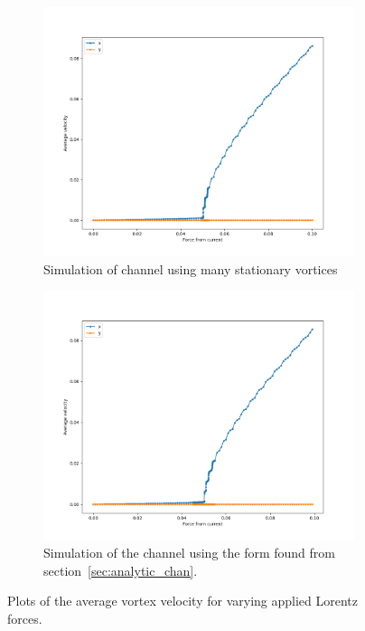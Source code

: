 \documentclass{article}
\numberwithin{equation}{section}
\begin{document}
\begin{figure}[htb]
\centering
\begin{subfigure}[t]{.49\textwidth}
    \centering
    \includegraphics[width=.9\linewidth]{results/Figures/Width1_velocities_cutoff=9.png}
    \caption{Simulation of channel using many stationary vortices}
    \label{fig:big_vels_channel}
\end{subfigure}
\hfill
\begin{subfigure}[t]{.49\textwidth}
    \centering
\includegraphics[width=.9\linewidth]{results/Figures/Width1_velocities_analytic_cutoff=9.png}
    \caption{Simulation of the channel using the form found from section~\ref{sec:analytic_chan}.}
    \label{fig:big_vels_analytic}
\end{subfigure}
\caption{Plots of the average vortex velocity for varying applied Lorentz forces.}
\label{fig:big_vels}
\end{figure}
\end{document}
